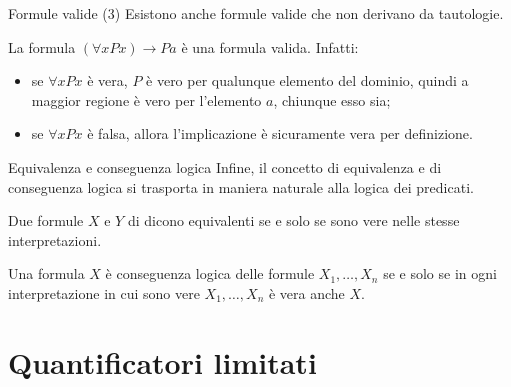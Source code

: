 \documentclass[10pt,dvipsnames,xcolor=table,handout]{beamer}
\begin{document}
\begin{frame}{Formule valide (3)}
    Esistono anche formule valide che non derivano da tautologie.
    \begin{example}
        La formula $(\forall x Px) \to Pa$ è una formula valida. Infatti:
        \begin{itemize}
            \item se $\forall x Px$ è vera, $P$ è vero per qualunque elemento del dominio, quindi a maggior regione è vero per l'elemento $a$, chiunque esso sia;
            \item se $\forall x Px$ è falsa, allora l'implicazione è sicuramente vera per definizione.
        \end{itemize}
    \end{example}
\end{frame}


\begin{frame}{Equivalenza e conseguenza logica}
    Infine, il concetto di equivalenza e di conseguenza logica si trasporta in maniera naturale alla logica dei predicati.
    \begin{definition}
        Due formule $X$ e $Y$ di dicono \alert{equivalenti} se e solo se sono vere nelle stesse interpretazioni.
    \end{definition}

    \begin{definition}
        Una formula $X$ è \alert{conseguenza logica} delle formule $X_1, \ldots, X_n$ se e solo se in ogni interpretazione in cui sono vere $X_1, \ldots, X_n$ è vera anche $X$.
    \end{definition}
\end{frame}

\section{Quantificatori limitati}
\end{document}
